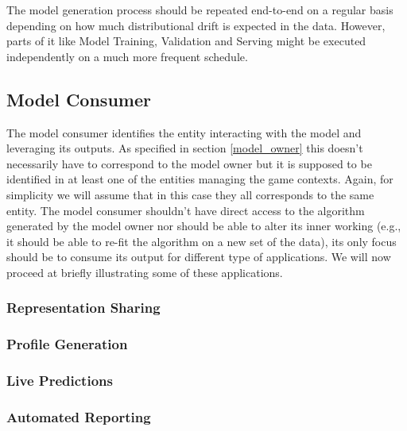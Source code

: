 The model generation process should be repeated end-to-end on a regular basis depending on how much distributional drift is expected in the data. However, parts of it like Model Training, Validation and Serving might be executed independently on a much more frequent schedule. 

\subsection{Model Consumer}
The model consumer identifies the entity interacting with the model and leveraging its outputs. As specified in section \ref{model_owner} this doesn't necessarily have to correspond to the model owner but it is supposed to be identified in at least one of the entities managing the game contexts. Again, for simplicity we will assume that in this case they all corresponds to the same entity. The model consumer shouldn't have direct access to the algorithm generated by the model owner nor should be able to alter its inner working (e.g., it should be able to re-fit the algorithm on a new set of the data), its only focus should be to consume its output for different type of applications. We will now proceed at briefly illustrating some of these applications.

\subsubsection{Representation Sharing}
\lorem

\subsubsection{Profile Generation}
\lorem

\subsubsection{Live Predictions}
\lorem

\subsubsection{Automated Reporting}
\lorem

